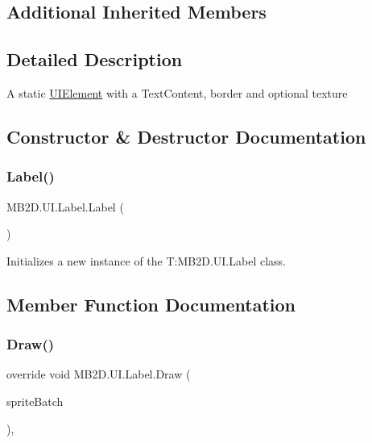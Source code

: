 \subsection*{Additional Inherited Members}


\subsection{Detailed Description}
A static \hyperlink{class_m_b2_d_1_1_u_i_1_1_u_i_element}{U\+I\+Element} with a Text\+Content, border and optional texture 



\subsection{Constructor \& Destructor Documentation}
\hypertarget{class_m_b2_d_1_1_u_i_1_1_label_af2e14465a2e06ca65487481d543de78c}{}\label{class_m_b2_d_1_1_u_i_1_1_label_af2e14465a2e06ca65487481d543de78c} 
\subsubsection{\texorpdfstring{Label()}{Label()}}
{\footnotesize\ttfamily M\+B2\+D.\+U\+I.\+Label.\+Label (\begin{DoxyParamCaption}{ }\end{DoxyParamCaption})\hspace{0.3cm}{\ttfamily [inline]}}



Initializes a new instance of the T\+:\+M\+B2\+D.\+U\+I.\+Label class. 



\subsection{Member Function Documentation}
\hypertarget{class_m_b2_d_1_1_u_i_1_1_label_a976ec212cedf0710fb35cd578e1e51b1}{}\label{class_m_b2_d_1_1_u_i_1_1_label_a976ec212cedf0710fb35cd578e1e51b1} 
\subsubsection{\texorpdfstring{Draw()}{Draw()}}
{\footnotesize\ttfamily override void M\+B2\+D.\+U\+I.\+Label.\+Draw (\begin{DoxyParamCaption}\item[{Sprite\+Batch}]{sprite\+Batch }\end{DoxyParamCaption})\hspace{0.3cm}{\ttfamily [inline]}, {\ttfamily [virtual]}}



